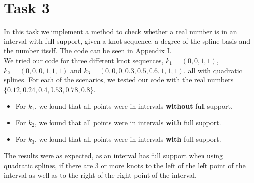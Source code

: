 \documentclass[]{article}
\begin{document}
\section*{Task 3}
In this task we implement a method to check whether a real number is in an interval with full support, given a knot sequence, a degree of the spline basis and the number itself. The code can be seen in Appendix I. \\
We tried our code for three different knot sequences, $k_1=(0, 0, 1, 1)$, $k_2=(0, 0, 0, 1, 1, 1)$ and $k_3=(0, 0, 0, 0.3, 0.5, 0.6, 1, 1, 1)$, all with quadratic splines. For each of the scenarios, we tested our code with the real numbers $\{0.12, 0.24, 0.4, 0.53, 0.78, 0.8\}$.
\begin{itemize}
	\item For $k_1$, we found that all points were in intervals \textbf{without} full support.
	\item For $k_2$, we found that all points were in intervals \textbf{with} full support.
	\item For $k_3$, we found that all points were in intervals \textbf{with} full support.
\end{itemize}
The results were as expected, as an interval has full support when using quadratic splines, if there are 3 or more knots to the left of the left point of the interval as well as to the right of the right point of the interval.
\end{document}
